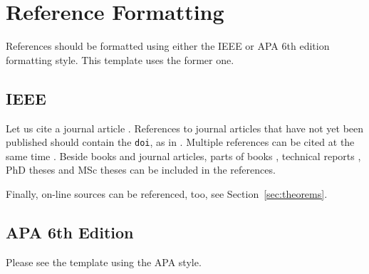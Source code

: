% 
\chapter{Reference Formatting}

References should be formatted using either the IEEE or APA 6th edition formatting style. This template uses the former one. 

\section{IEEE}

Let us cite a journal article \cite{mihailovic06}. References to journal articles that have not yet been published should contain the \texttt{doi}, as in \cite{tusar14}.
Multiple references can be cited at the same time \cite{depolli13,kobal04,grace10,novak12eng,zupanc13}. Beside books and journal articles, parts of books \cite{smodis09}, technical reports \cite{ivekovic13eng}, PhD theses \cite{dovgan14eng} and MSc theses \cite{tusar07eng} can be included in the references.

Finally, on-line sources can be referenced, too, see Section~\ref{sec:theorems}.

\section{APA 6th Edition}

Please see the template using the APA style. 